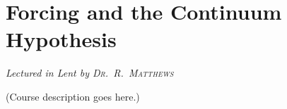 \chapter[Forcing and the Continuum Hypothesis \\ \textnormal{\emph{Lectured in Lent \oldstylenums{2024} by \textsc{Dr.\ R.\ Matthews}}}]{Forcing and the Continuum Hypothesis}
\emph{\Large Lectured in Lent  by \textsc{Dr.\ R.\ Matthews}}

(Course description goes here.)


